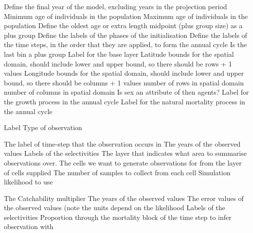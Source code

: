  {Define the final year of the model, excluding years in the projection period}
 {Minimum age of individuals in the population}
 {Maximum age of individuals in the population}
 {Define the oldest age or extra length midpoint (plus group size) as a plus group}
 {Define the labels of the phases of the initialisation}
 {Define the labels of the time steps, in the order that they are applied, to form the annual cycle}
 {}
 {Is the last bin a plus group}
 {Label for the base layer}
 {Latitude bounds for the spatial domain, should include lower and upper bound, so there should be rows + 1 values}
 {Longitude bounds for the spatial domain, should include lower and upper bound, so there should be columns + 1 values}
 {number of rows in spatial domain}
 {number of columns in spatial domain}
 {Is sex an attribute of then agents?}
 {Label for the growth process in the annual cycle}
 {Label for the natural mortality process in the annual cycle}
\par\par
{} {Label}
 {Type of observation}
\par\textbf{}\par
{} {The label of time-step that the observation occurs in}
 {The years of the observed values}
 {Labels of the selectivities}
 {The layer that indicates what area to summarise observations over.}
 {The cells we want to generate observations for from the layer of cells supplied}
 {The number of samples to collect from each cell}
 {Simulation likelihood to use}
\par\textbf{}\par
{} {The Catchability multiplier}
 {The years of the observed values}
 {The error values of the observed values (note the units depend on the likelihood}
 {Labels of the selectivities}
 {Proportion through the mortality block of the time step to infer observation with}
